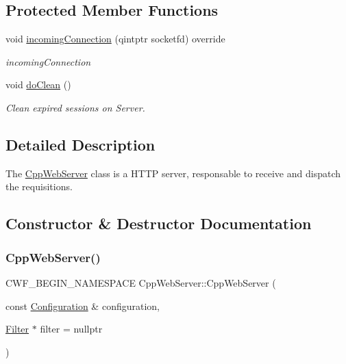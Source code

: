\subsection*{Protected Member Functions}
\begin{DoxyCompactItemize}
\item 
void \hyperlink{class_cpp_web_server_a49addc6ee3148d11134062e6b7a56791}{incoming\+Connection} (qintptr socketfd) override
\begin{DoxyCompactList}\small\item\em incoming\+Connection \end{DoxyCompactList}\item 
\mbox{\label{class_cpp_web_server_a1e53101dea816fe425a44665a8949c4f}} 
void \hyperlink{class_cpp_web_server_a1e53101dea816fe425a44665a8949c4f}{do\+Clean} ()
\begin{DoxyCompactList}\small\item\em Clean expired sessions on Server. \end{DoxyCompactList}\end{DoxyCompactItemize}


\subsection{Detailed Description}
The \hyperlink{class_cpp_web_server}{Cpp\+Web\+Server} class is a H\+T\+TP server, responsable to receive and dispatch the requisitions. 

\subsection{Constructor \& Destructor Documentation}
\mbox{\label{class_cpp_web_server_a9c5598c541de45a40d2ebad698e9a616}} 
\subsubsection{\texorpdfstring{Cpp\+Web\+Server()}{CppWebServer()}}
{\footnotesize\ttfamily C\+W\+F\+\_\+\+B\+E\+G\+I\+N\+\_\+\+N\+A\+M\+E\+S\+P\+A\+CE Cpp\+Web\+Server\+::\+Cpp\+Web\+Server (\begin{DoxyParamCaption}\item[{const \hyperlink{class_configuration}{Configuration} \&}]{configuration,  }\item[{\hyperlink{class_filter}{Filter} $\ast$}]{filter = {\ttfamily nullptr} }\end{DoxyParamCaption})\hspace{0.3cm}{\ttfamily [explicit]}}




